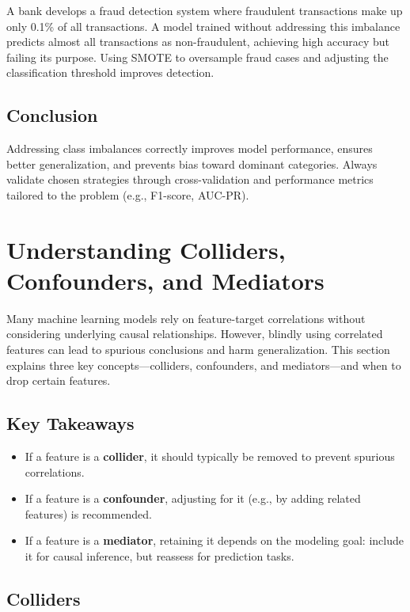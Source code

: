 \documentclass[12pt,openany]{book}
\begin{document}
\begin{examplebox}
A bank develops a fraud detection system where fraudulent transactions make up only 0.1\% of all transactions. A model trained without addressing this imbalance predicts almost all transactions as non-fraudulent, achieving high accuracy but failing its purpose. Using SMOTE to oversample fraud cases and adjusting the classification threshold improves detection.
\end{examplebox}


\subsection{Conclusion}

Addressing class imbalances correctly improves model performance, ensures better generalization, and prevents bias toward dominant categories. Always validate chosen strategies through cross-validation and performance metrics tailored to the problem (e.g., F1-score, AUC-PR).



\section{Understanding Colliders, Confounders, and Mediators}

Many machine learning models rely on feature-target correlations without considering underlying causal relationships. However, blindly using correlated features can lead to spurious conclusions and harm generalization. This section explains three key concepts—colliders, confounders, and mediators—and when to drop certain features.

\subsection{Key Takeaways}
\begin{itemize}
    \item If a feature is a \textbf{collider}, it should typically be removed to prevent spurious correlations.
    \item If a feature is a \textbf{confounder}, adjusting for it (e.g., by adding related features) is recommended.
    \item If a feature is a \textbf{mediator}, retaining it depends on the modeling goal: include it for causal inference, but reassess for prediction tasks.
\end{itemize}


\subsection{Colliders}
\end{document}
